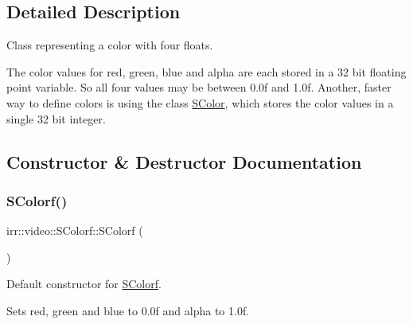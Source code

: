 \subsection{Detailed Description}
Class representing a color with four floats. 

The color values for red, green, blue and alpha are each stored in a 32 bit floating point variable. So all four values may be between 0.\+0f and 1.\+0f. Another, faster way to define colors is using the class \hyperlink{classirr_1_1video_1_1SColor}{S\+Color}, which stores the color values in a single 32 bit integer. 

\subsection{Constructor \& Destructor Documentation}
\mbox{\label{classirr_1_1video_1_1SColorf_a701ea1b449c2aae4a3dd44a13055ac3e}} 
\subsubsection{\texorpdfstring{S\+Colorf()}{SColorf()}\hspace{0.1cm}{\footnotesize\ttfamily [1/3]}}
{\footnotesize\ttfamily irr\+::video\+::\+S\+Colorf\+::\+S\+Colorf (\begin{DoxyParamCaption}{ }\end{DoxyParamCaption})\hspace{0.3cm}{\ttfamily [inline]}}



Default constructor for \hyperlink{classirr_1_1video_1_1SColorf}{S\+Colorf}. 

Sets red, green and blue to 0.\+0f and alpha to 1.\+0f. \mbox{\label{classirr_1_1video_1_1SColorf_adaf8df839d5174aedba17e61ba28fc64}} 
